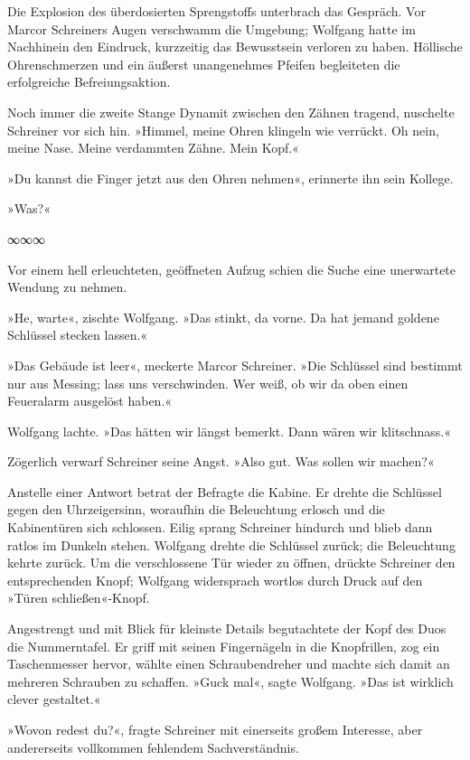 Die Explosion des überdosierten Sprengstoffs unterbrach das Gespräch. Vor Marcor Schreiners Augen verschwamm die Umgebung; Wolfgang hatte im Nachhinein den Eindruck, kurzzeitig das Bewusstsein verloren zu haben. Höllische Ohrenschmerzen und ein äußerst unangenehmes Pfeifen begleiteten die erfolgreiche Befreiungsaktion.

Noch immer die zweite Stange Dynamit zwischen den Zähnen tragend, nuschelte Schreiner vor sich hin. »Himmel, meine Ohren klingeln wie verrückt. Oh nein, meine Nase. Meine verdammten Zähne. Mein Kopf.«

»Du kannst die Finger jetzt aus den Ohren nehmen«, erinnerte ihn sein Kollege.

»Was?«

\begin{center}
∞∞∞
\end{center}

Vor einem hell erleuchteten, geöffneten Aufzug schien die Suche eine unerwartete Wendung zu nehmen.

»He, warte«, zischte Wolfgang. »Das stinkt, da vorne. Da hat jemand goldene Schlüssel stecken lassen.«

»Das Gebäude ist leer«, meckerte Marcor Schreiner. »Die Schlüssel sind bestimmt nur aus Messing; lass uns verschwinden. Wer weiß, ob wir da oben einen Feueralarm ausgelöst haben.«

Wolfgang lachte. »Das hätten wir längst bemerkt. Dann wären wir klitschnass.«

Zögerlich verwarf Schreiner seine Angst. »Also gut. Was sollen wir machen?«

Anstelle einer Antwort betrat der Befragte die Kabine. Er drehte die Schlüssel gegen den Uhrzeigersinn, woraufhin die Beleuchtung erlosch und die Kabinentüren sich schlossen. Eilig sprang Schreiner hindurch und blieb dann ratlos im Dunkeln stehen. Wolfgang drehte die Schlüssel zurück; die Beleuchtung kehrte zurück. Um die verschlossene Tür wieder zu öffnen, drückte Schreiner den entsprechenden Knopf; Wolfgang widersprach wortlos durch Druck auf den »Türen schließen«-Knopf.

Angestrengt und mit Blick für kleinste Details begutachtete der Kopf des Duos die Nummerntafel. Er griff mit seinen Fingernägeln in die Knopfrillen, zog ein Taschenmesser hervor, wählte einen Schraubendreher und machte sich damit an mehreren Schrauben zu schaffen. »Guck mal«, sagte Wolfgang. »Das ist wirklich clever gestaltet.«

»Wovon redest du?«, fragte Schreiner mit einerseits großem Interesse, aber andererseits vollkommen fehlendem Sachverständnis.

